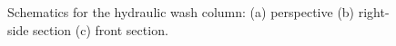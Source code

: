 \begin{figure}[h]
    \centering
    
    \caption{Schematics for the hydraulic wash column: (a) perspective (b) right-side section (c) front section.}
    \label{fig:wash column schematic executive}
\end{figure}